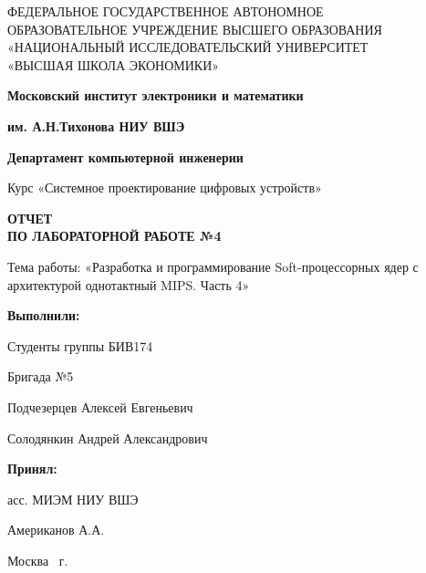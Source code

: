 \begin{titlepage}
	\begin{center}
 		ФЕДЕРАЛЬНОЕ  ГОСУДАРСТВЕННОЕ АВТОНОМНОЕ \\
		ОБРАЗОВАТЕЛЬНОЕ УЧРЕЖДЕНИЕ ВЫСШЕГО ОБРАЗОВАНИЯ\\
		«НАЦИОНАЛЬНЫЙ ИССЛЕДОВАТЕЛЬСКИЙ УНИВЕРСИТЕТ\\
		«ВЫСШАЯ ШКОЛА ЭКОНОМИКИ»
	\end{center}
	
	\begin{center}
		\textbf{Московский институт электроники и математики}
		
		\textbf{им. А.Н.Тихонова НИУ ВШЭ}
		
		\vspace{2ex}
		
		\textbf{Департамент компьютерной инженерии}
	\end{center}
	\vspace{1ex}	
	
	\begin{center}
		Курс «Системное проектирование цифровых устройств»
	\end{center}	
	
	
	\begin{center}
	\textbf{ОТЧЕТ\\
		ПО ЛАБОРАТОРНОЙ РАБОТЕ №4
	}
	\end{center}	

	\begin{center}
		Тема работы: «Разработка и программирование Soft-процессорных ядер с архитектурой однотактный MIPS. Часть 4»
	\end{center}

	\vspace{2ex}

	\begin{flushright}
		\textbf{Выполнили:}
		
		\vspace{2ex}
		
		Студенты группы БИВ174
		
		Бригада №5
		
		\vspace{2ex}
		
		Подчезерцев Алексей Евгеньевич
		
		Солодянкин Андрей Александрович
		\vspace{2ex}
		
		\textbf{Принял:}
		
		асс. МИЭМ НИУ ВШЭ
		
		Американов А.А.
		
	\end{flushright}

	\vfill
	\begin{center}
		Москва \the\year \, г.
	\end{center}
	
\end{titlepage}
\addtocounter{page}{1}